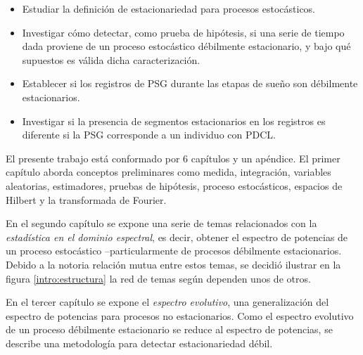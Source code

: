 \begin{itemize}
\item Estudiar la definición de estacionariedad para procesos estocásticos.

\item Investigar cómo detectar, como prueba de hipótesis, si una serie de tiempo dada proviene
de un proceso estocástico débilmente estacionario, y bajo qué supuestos 
es válida dicha caracterización.

\item Establecer si los registros de PSG durante las etapas de sueño son débilmente estacionarios.

\item Investigar si la presencia de segmentos estacionarios en los registros es diferente si la
PSG corresponde a un individuo con PDCL.
\end{itemize}




El presente trabajo está conformado por 6 capítulos y un apéndice. El primer capítulo aborda conceptos preliminares como medida, integración, variables aleatorias, estimadores, pruebas de hipótesis, proceso estocásticos, espacios de Hilbert y la transformada de Fourier.


En el segundo capítulo se expone una serie de temas relacionados con la \textit{estadística en el dominio espectral}, es decir, obtener el espectro de potencias de un proceso estocástico --particularmente de procesos débilmente estacionarios.
%
Debido a la notoria relación mutua entre estos temas, se decidió ilustrar en la figura \ref{intro:estructura} la red de temas según dependen unos de otros.

En el tercer capítulo se expone el \textit{espectro evolutivo}, una generalización del espectro de potencias para procesos no estacionarios.
%
Como el espectro evolutivo de un proceso débilmente estacionario se reduce al espectro de potencias, se describe una metodología para detectar estacionariedad débil.


